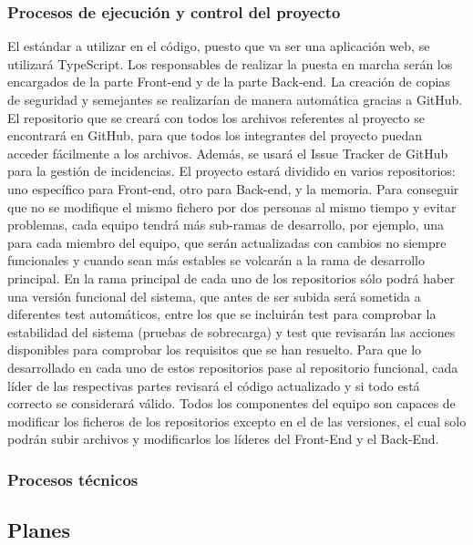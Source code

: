 \documentclass{article}
\begin{document}
\subsubsection{Procesos de ejecución y control del proyecto}
El estándar a utilizar en el código, puesto que va ser una aplicación web, se utilizará TypeScript. Los responsables de realizar la puesta en marcha serán los encargados de la parte Front-end y de la parte Back-end. La creación de copias de seguridad y semejantes se realizarían de manera automática gracias a GitHub. 
El repositorio que se creará con todos los archivos referentes al proyecto se encontrará en GitHub, para que todos los integrantes del proyecto puedan acceder fácilmente a los archivos. Además, se usará el Issue Tracker de GitHub para la gestión de incidencias. 
El proyecto estará dividido en varios repositorios: uno específico para Front-end, otro para Back-end, y la memoria. Para conseguir que no se modifique el mismo fichero por dos personas al mismo tiempo y evitar problemas, cada equipo tendrá más sub-ramas de desarrollo, por ejemplo, una para cada miembro del equipo, que serán actualizadas con cambios no siempre funcionales y cuando sean más estables se volcarán a la rama de desarrollo principal. 
En la rama principal de cada uno de los repositorios sólo podrá haber una versión funcional del sistema, que antes de ser subida será sometida a diferentes test automáticos, entre los que se incluirán test para comprobar la estabilidad del sistema (pruebas de sobrecarga) y test que revisarán las acciones disponibles para comprobar los requisitos que se han resuelto. 
Para que lo desarrollado en cada uno de estos repositorios pase al repositorio funcional, cada líder de las respectivas partes revisará el código actualizado y si todo está correcto se considerará válido. Todos los componentes del equipo son capaces de modificar los ficheros de los repositorios excepto en el de las versiones, el cual solo podrán subir archivos y modificarlos los líderes del Front-End y el Back-End.

\subsubsection{Procesos técnicos}
\newpage
\subsection{Planes}
\end{document}

